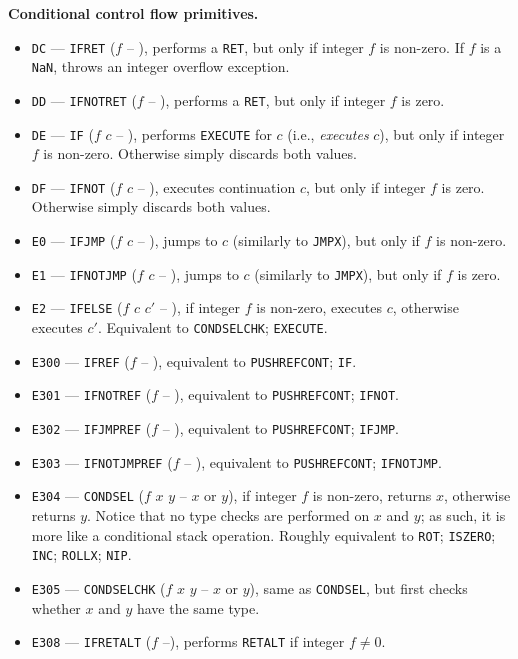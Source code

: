\documentclass[12pt,oneside]{article}
\def\makepoint#1{\medbreak\noindent{\bf #1.\ }}
\def\nxsubpoint{\refstepcounter{subsubsection}%
  \smallbreak\makepoint{\thesubsubsection}}
\def\emb#1{\textbf{#1.}}
\begin{document}
\nxsubpoint\emb{Conditional control flow primitives}\label{sp:prim.cond.flow}
\begin{itemize}
\item {\tt DC} --- {\tt IFRET} ($f$ -- ), performs a {\tt RET}, but only if integer $f$ is non-zero. If $f$ is a {\tt NaN}, throws an integer overflow exception.
\item {\tt DD} --- {\tt IFNOTRET} ($f$ -- ), performs a {\tt RET}, but only if integer $f$ is zero.
\item {\tt DE} --- {\tt IF} ($f$ $c$ -- ), performs {\tt EXECUTE} for $c$ (i.e., {\em executes} $c$), but only if integer $f$ is non-zero. Otherwise simply discards both values.
\item {\tt DF} --- {\tt IFNOT} ($f$ $c$ -- ), executes continuation $c$, but only if integer $f$ is zero. Otherwise simply discards both values.
\item {\tt E0} --- {\tt IFJMP} ($f$ $c$ -- ), jumps to $c$ (similarly to {\tt JMPX}), but only if $f$ is non-zero.
\item {\tt E1} --- {\tt IFNOTJMP} ($f$ $c$ -- ), jumps to $c$ (similarly to {\tt JMPX}), but only if $f$ is zero.
\item {\tt E2} --- {\tt IFELSE} ($f$ $c$ $c'$ -- ), if integer $f$ is non-zero, executes $c$, otherwise executes $c'$. Equivalent to {\tt CONDSELCHK}; {\tt EXECUTE}.
\item {\tt E300} --- {\tt IFREF} ($f$ -- ), equivalent to {\tt PUSHREFCONT}; {\tt IF}.
\item {\tt E301} --- {\tt IFNOTREF} ($f$ -- ), equivalent to {\tt PUSHREFCONT}; {\tt IFNOT}.
\item {\tt E302} --- {\tt IFJMPREF} ($f$ -- ), equivalent to {\tt PUSHREFCONT}; {\tt IFJMP}.
\item {\tt E303} --- {\tt IFNOTJMPREF} ($f$ -- ), equivalent to {\tt PUSHREFCONT}; {\tt IFNOTJMP}.
\item {\tt E304} --- {\tt CONDSEL} ($f$ $x$ $y$ -- $x$ or $y$), if integer $f$ is non-zero, returns $x$, otherwise returns $y$. Notice that no type checks are performed on $x$ and $y$; as such, it is more like a conditional stack operation. Roughly equivalent to {\tt ROT}; {\tt ISZERO}; {\tt INC}; {\tt ROLLX}; {\tt NIP}.
\item {\tt E305} --- {\tt CONDSELCHK} ($f$ $x$ $y$ -- $x$ or $y$), same as {\tt CONDSEL}, but first checks whether $x$ and $y$ have the same type.
\item {\tt E308} --- {\tt IFRETALT} ($f$ --), performs {\tt RETALT} if integer $f\neq0$.

\end{itemize}
\end{document}
